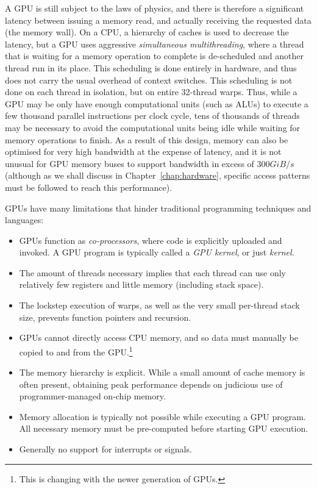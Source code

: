A GPU is still subject to the laws of physics, and there is therefore
a significant latency between issuing a memory read, and actually
receiving the requested data (the memory wall).  On a CPU, a hierarchy
of caches is used to decrease the latency, but a GPU uses aggressive
\textit{simultaneous multithreading}, where a thread that is waiting
for a memory operation to complete is de-scheduled and another thread
run in its place.  This scheduling is done entirely in hardware, and
thus does not carry the usual overhead of context switches.  This
scheduling is not done on each thread in isolation, but on entire
32-thread warps.  Thus, while a GPU may be only have enough
computational units (such as ALUs) to execute a few thousand parallel
instructions per clock cycle, tens of thousands of threads may be
necessary to avoid the computational units being idle while waiting
for memory operations to finish.  As a result of this design, memory
can also be optimised for very high bandwidth at the expense of
latency, and it is not unusual for GPU memory buses to support
bandwidth in excess of $300GiB/s$ (although as we shall discuss in
Chapter~\ref{chap:hardware}, specific access patterns must be followed
to reach this performance).

GPUs have many limitations that hinder traditional programming
techniques and languages:

\begin{itemize}
\item GPUs function as \textit{co-processors}, where code is
  explicitly uploaded and invoked.  A GPU program is typically called
  a \textit{GPU kernel}, or just \textit{kernel}.
\item The amount of threads necessary implies that each thread can use
  only relatively few registers and little memory (including stack
  space).
\item The lockstep execution of warps, as well as the very small
  per-thread stack size, prevents function pointers and recursion.
\item GPUs cannot directly access CPU memory, and so data must
  manually be copied to and from the GPU.\footnote{This is changing
    with the newer generation of GPUs.}
\item The memory hierarchy is explicit.  While a small amount of cache
  memory is often present, obtaining peak performance depends on
  judicious use of programmer-managed on-chip memory.
\item Memory allocation is typically not possible while executing a
  GPU program.  All necessary memory must be pre-computed before
  starting GPU execution.
\item Generally no support for interrupts or signals.
\end{itemize}

